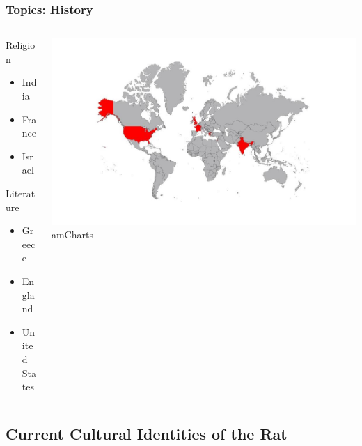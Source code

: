 \documentclass{beamer}
\begin{document}
\begin{frame}
\frametitle{Topics: History}
\begin{columns}
\begin{column}{.3\textwidth}
Religion
\begin{itemize}
\item India
\item France
\item Israel
\linebreak
\end{itemize}
Literature
\begin{itemize}
\item Greece
\item England
\item United States
\end{itemize}
\end{column}
\begin{column}{.7\textwidth}
\begin{center}
\includegraphics[width=1\textwidth,trim={0 .45in 0 .45in}]{WorldMap}
\linebreak
{\tiny amCharts}
\end{center}
\end{column}
\end{columns}
\end{frame}

\subsection[Current Cultural Identities of the Rat]{Current Cultural Identities of the Rat}
\end{document}

